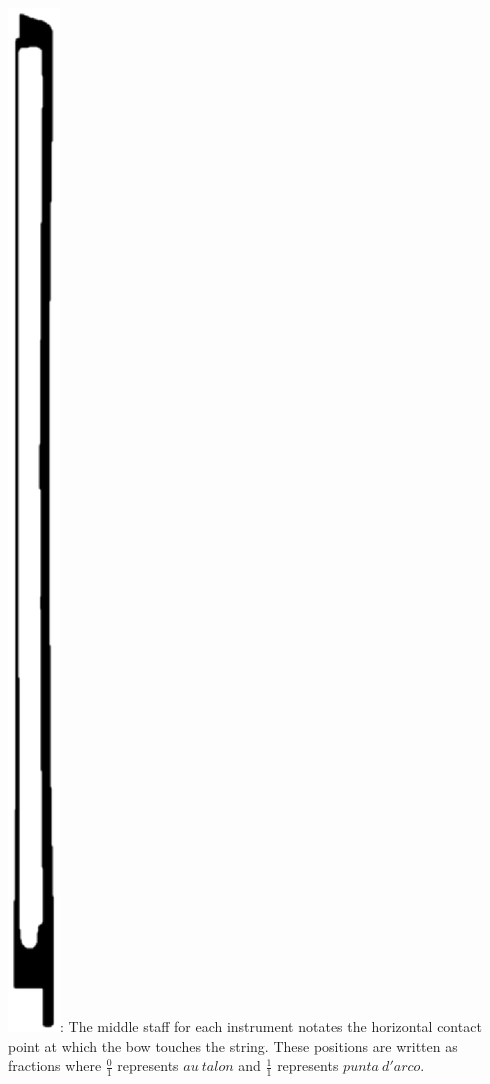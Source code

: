 \documentclass[10pt]{article}
\begin{document}
 \includegraphics[height=0.025\textheight]{bow_position_tablature.eps}: The middle staff for each instrument notates the horizontal contact point at which the bow touches the string. These positions are written as fractions where \( \frac{0}{1} \) represents $au \ talon$ and \( \frac{1}{1} \) represents $punta \ d'arco$.
\end{document}

